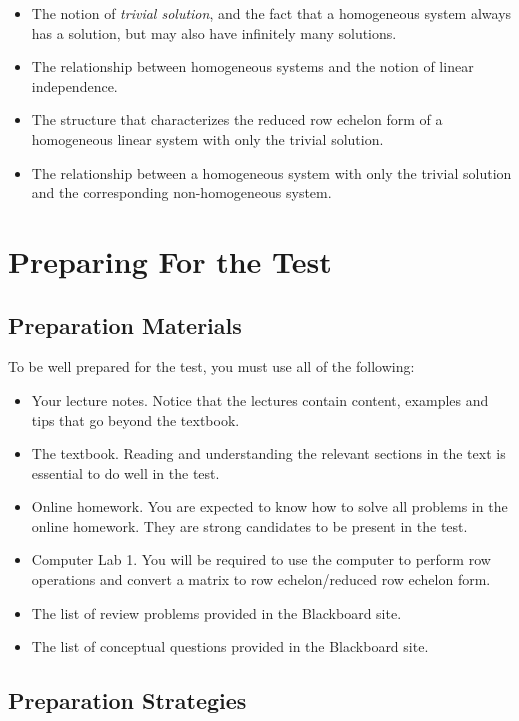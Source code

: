\documentclass[12pt]{article}
\begin{document}
\begin{itemize}
\begin{itemize}
\item The notion of \emph{trivial solution}, and the fact that a homogeneous system always has a solution, but may also have infinitely many solutions.
\item The relationship between homogeneous systems and the notion of linear independence.
\item The structure that characterizes the reduced row echelon form of a homogeneous linear system with only the trivial solution.
\item The relationship between a homogeneous system with only the trivial solution and the corresponding non-homogeneous system.
\end{itemize}
\end{itemize}

\section{Preparing For the Test}

\subsection{Preparation Materials}

To be well prepared for the test, you must use all of the following:

\begin{itemize} 
\item Your lecture notes. Notice that the lectures contain content, examples and tips that go beyond the textbook.
\item The textbook. Reading and understanding the relevant sections in the text is essential to do well in the test.
\item Online homework. You are expected to know how to solve all problems in the online homework. They are strong candidates to be present in the test.
\item Computer Lab 1. You will be required to use the computer to perform row operations and convert a matrix to row echelon/reduced row echelon form.
\item The list of review problems provided in the Blackboard site.
\item The list of conceptual questions provided in the Blackboard site.
\end{itemize}

\subsection{Preparation Strategies}
\end{document}
